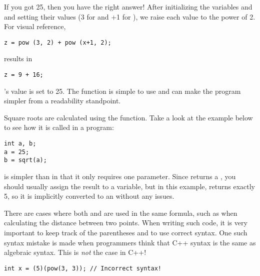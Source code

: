	If you got 25, then you have the right answer! 
	After initializing the variables  and  and setting their values (3 for  and +1 for ), we raise each value to the power of 2. 
	For visual reference,

\noindent\begin{minipage}{\linewidth}\begin{lstlisting}
z = pow (3, 2) + pow (x+1, 2);
\end{lstlisting}\end{minipage}
results in

\noindent\begin{minipage}{\linewidth}\begin{lstlisting}
z = 9 + 16;
\end{lstlisting}\end{minipage}	
	
	's value is set to 25. 
	The  function is simple to use and can make the program simpler from a readability standpoint.

	Square roots are calculated using the  function. 
	Take a look at the example below to see how it is called in a program:

\noindent\begin{minipage}{\linewidth}\begin{lstlisting}
int a, b;
a = 25;
b = sqrt(a);
\end{lstlisting}\end{minipage}

	 is simpler than  in that it only requires one parameter. 
	Since  returns a , you should usually assign the result to a  variable, but in this example,  returns exactly 5, so it is implicitly converted to an  without any issues. 
	
	There are cases where both  and  are used in the same formula, such as when calculating the distance between two points. 
	When writing such code, it is very important to keep track of the parentheses and to use correct syntax. 
	One such syntax mistake is made when programmers think that C++ syntax is the same as algebraic syntax. 
	This is \emph{not} the case in C++!

\noindent\begin{minipage}{\linewidth}\begin{lstlisting}
int x = (5)(pow(3, 3)); // Incorrect syntax!
\end{lstlisting}\end{minipage}


